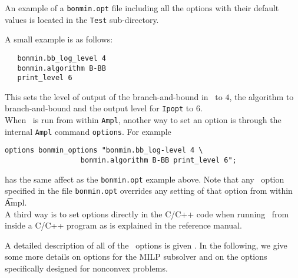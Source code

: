 An example of a {\tt bonmin.opt} file including all the options
with their default values is located in the {\tt Test}
sub-directory.

A small example is as follows:
\begin{verbatim}
   bonmin.bb_log_level 4
   bonmin.algorithm B-BB
   print_level 6
\end{verbatim}
This sets the level of output of the branch-and-bound in \Bonmin\ to $4$, the algorithm to branch-and-bound
and the output level for {\tt Ipopt} to $6$.\\

When \Bonmin\ is run from within {\tt Ampl}, another way to set
an option is through the
internal {\tt Ampl} command {\tt options}.
For example
\begin{verbatim}
options bonmin_options "bonmin.bb_log-level 4 \
                  bonmin.algorithm B-BB print_level 6";
\end{verbatim}
has the same affect as the {\tt bonmin.opt} example above.
Note that any \Bonmin\ option specified in the file {\tt bonmin.opt}
overrides any setting of that option from within {\t Ampl}.\\

A third way is to set options directly in the C/C++ code when
running \Bonmin\ from inside a C/C++ program as is explained in the reference manual.

A detailed description of all of the \Bonmin\ options is given .
In the following, we give some more details on options for the MILP subsolver and
on the options specifically designed
for nonconvex problems.\\

